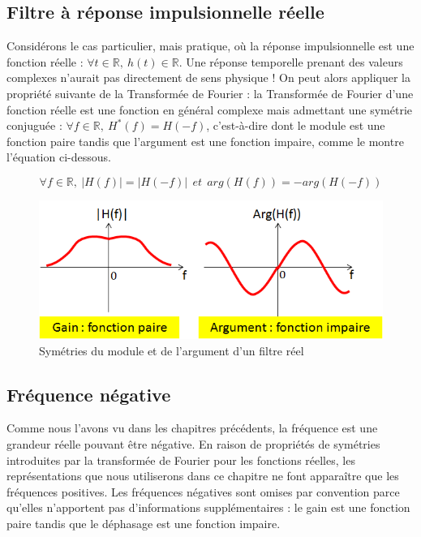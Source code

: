	\vspace{1\baselineskip}
	
	\subsection{Filtre à réponse impulsionnelle réelle}
	Considérons le cas particulier, mais pratique, où la réponse impulsionnelle est une fonction réelle : $ \forall t \in \mathbb{R},~h(t) \in \mathbb{R}$. Une réponse temporelle prenant des valeurs complexes n’aurait pas directement de sens physique ! On peut alors appliquer la propriété suivante de la Transformée de Fourier : la Transformée de Fourier d’une fonction réelle est une fonction en général complexe mais admettant une symétrie conjuguée : $\forall f \in \mathbb{R},~H^{*}(f) = H(-f)$, c'est-à-dire dont le module est une fonction paire tandis que l’argument est une fonction impaire, comme le montre l'équation ci-dessous. 
	
	\begin{equation}\label{key}
	\forall f \in \mathbb{R},~|H(f)| = |H(-f)| ~~et~~arg(H(f)) = -arg(H(-f))
	\end{equation}
	
	\begin{figure}[h]
		\centering
		\includegraphics[scale=0.6]{images/symetrie_filtre_reel.png}
		\caption{Symétries du module et de l'argument d'un filtre réel}	
		\label{Fig:symetrie_filtre_reel} 
	\end{figure}
	 
	
	\subsection{Fréquence négative}
	
	Comme nous l'avons vu dans les chapitres précédents, la fréquence est une grandeur réelle pouvant être négative. En raison de propriétés de symétries introduites par la transformée de Fourier pour les fonctions réelles, les représentations que nous utiliserons dans ce chapitre ne font apparaître que les fréquences positives. Les fréquences négatives sont omises par convention parce qu'elles n'apportent pas d'informations supplémentaires : le gain est une fonction paire tandis que le déphasage est une fonction impaire.
	
